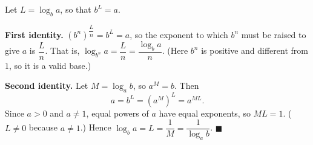 Let $L=\log_ba$, so that $b^L=a$.

\textbf{First identity.} $\left(b^n\right)^{\dfrac Ln}=b^L=a$, so the exponent to which $b^n$ must be raised to give $a$ is $\dfrac Ln$. That is, $\log_{b^n}a=\dfrac{L}{n}=\dfrac{\log_ba}{n}$. (Here $b^n$ is positive and different from $1$, so it is a valid base.)

\textbf{Second identity.} Let $M=\log_ab$, so $a^M=b$. Then
\[a=b^L=\left(a^M\right)^L=a^{ML}.\]
Since $a>0$ and $a\ne1$, equal powers of $a$ have equal exponents, so $ML=1$. ($L\ne0$ because $a\ne1$.) Hence $\log_ba=L=\dfrac1M=\dfrac{1}{\log_ab}$. $\blacksquare$
